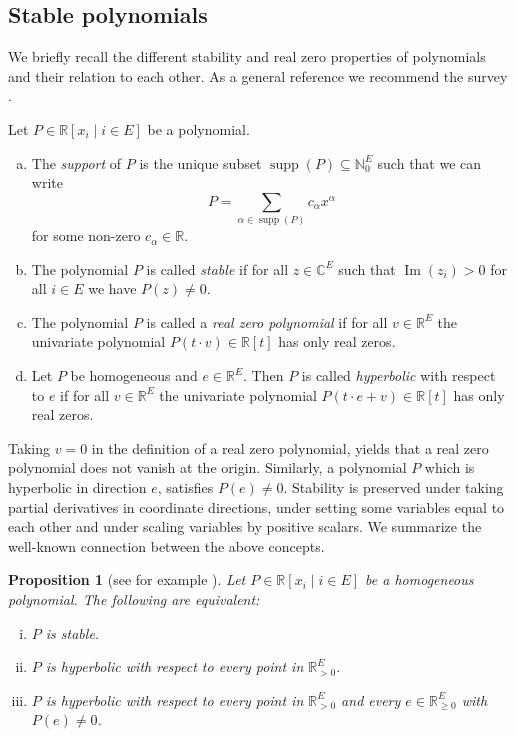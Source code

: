 \documentclass[11pt]{article}
\newtheorem{prop}[theo]{Proposition}
\theoremstyle{definition}
\numberwithin{equation}{section}
\newcommand{\N}{{\mathbb N}}
\newcommand{\R}{{\mathbb R}}
\newcommand{\C}{{\mathbb C}}
\newcommand{\supp}{\operatorname{supp}}
\newcommand{\Ima}{\operatorname{Im}}
\begin{document}
\subsection{Stable polynomials}
We briefly recall the different stability and real zero properties of polynomials and their relation to each other. As a general reference we recommend the survey \cite{pemantle}.
\begin{Def}
    Let $P\in\R[x_i\mid i\in E]$ be a polynomial.
    \begin{enumerate}[(a)]
        \item The \emph{support} of $P$ is the unique subset $\supp(P)\subseteq\N_0^E$ such that we can write
        \begin{equation*}
            P=\sum_{\alpha\in\supp(P)}c_\alpha x^\alpha
        \end{equation*}
        for some non-zero $c_\alpha\in\R$.
        \item The polynomial $P$ is called \emph{stable} if for all $z\in\C^E$ such that $\Ima(z_i)>0$ for all $i\in E$ we have $P(z)\neq0$.
        \item The polynomial $P$ is called a \emph{real zero polynomial} if for all $v\in\R^E$ the univariate polynomial $P(t\cdot v)\in\R[t]$ has only real zeros.
        \item Let $P$ be homogeneous and $e\in\R^E$. Then $P$ is called \emph{hyperbolic} with respect to $e$ if for all $v\in\R^E$ the univariate polynomial $P(t\cdot e+v)\in\R[t]$ has only real zeros.
    \end{enumerate}
\end{Def}

Taking $v=0$ in the definition of a real zero polynomial, yields that a real zero polynomial does not vanish at the origin. Similarly, a polynomial $P$ which is hyperbolic in direction $e$, satisfies $P(e)\neq0$. Stability is preserved under taking partial derivatives in coordinate directions, under setting some variables equal to each other and under scaling variables by positive scalars. We summarize the well-known connection between the above concepts.

\begin{prop}[see for example {\cite[Proposition 5.3]{pemantle}}]\label{prop:stablehyp}
    Let $P\in\R[x_i\mid i\in E]$ be a homogeneous polynomial. The following are equivalent:
    \begin{enumerate}[(i)]
        \item $P$ is stable.
        \item $P$ is hyperbolic with respect to every point in $\R_{>0}^E$.
        \item $P$ is hyperbolic with respect to every point in $\R_{>0}^E$ and every $e\in\R_{\geq0}^E$ with $P(e)\neq0$.
    \end{enumerate}
\end{prop}
\end{document}
